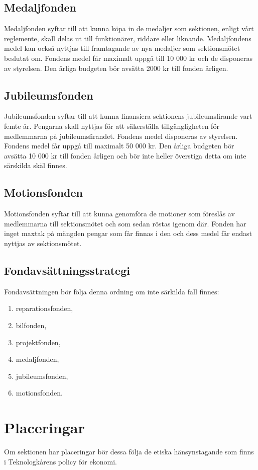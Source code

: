 \documentclass{dsekprotokoll}
\begin{document}
\subsection{Medaljfonden}
Medaljfonden syftar till att kunna köpa in de medaljer som sektionen, enligt
vårt reglemente, skall delas ut till funktionärer, riddare eller
liknande. Medaljfondens medel kan också nyttjas till framtagande av nya medaljer
som sektionsmötet beslutat om. Fondens medel får maximalt uppgå till 10 000 kr
och de disponeras av styrelsen. Den årliga budgeten bör avsätta 2000 kr till
fonden årligen.

\subsection{Jubileumsfonden}
Jubileumsfonden syftar till att kunna finansiera sektionens jubileumsfirande
vart femte år.  Pengarna skall nyttjas för att säkerställa tillgängligheten för
medlemmarna på jubileumsfirandet. Fondens medel disponeras av styrelsen.
Fondens medel får uppgå till maximalt 50 000 kr.  Den årliga budgeten bör
avsätta 10 000 kr till fonden årligen och bör inte heller överstiga detta om
inte särskilda skäl finnes.

\subsection{Motionsfonden}
Motionsfonden syftar till att kunna genomföra de motioner som föreslås av
medlemmarna till sektionsmötet och som sedan röstas igenom där. Fonden har inget
maxtak på mängden pengar som får finnas i den och dess medel får endast nyttjas
av sektionsmötet.

\subsection{Fondavsättningsstrategi}
Fondavsättningen bör följa denna ordning om inte särkilda fall finnes:
\begin{enumerate}
  \item reparationsfonden,
  \item bilfonden,
  \item projektfonden,
  \item medaljfonden,
  \item jubileumsfonden,
  \item motionsfonden.
\end{enumerate}

\section{Placeringar}
Om sektionen har placeringar bör dessa följa de etiska hänsynstagande som finns
i Teknologkårens policy för ekonomi.
\end{document}

